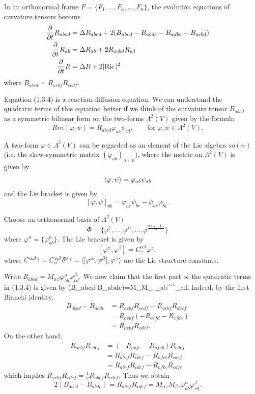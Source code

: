 In an orthonormal frame $F=\{F_1,\ldots,F_a,\ldots,F_n\}$, the
evolution equations of curvature tensors become
\begin{align}
\frac{\partial}{\partial t}R_{abcd}&=\Delta
R_{abcd}+2(B_{abcd}-B_{abdc}-B_{adbc}+B_{acbd}) \\  %
\frac{\partial}{\partial t}R_{ab}&=\Delta
R_{ab}+2R_{acbd}R_{cd}   \\%
\frac{\partial}{\partial t}R&=\Delta R+2|\Ric|^2  %
\end{align}
where $B_{abcd}=R_{aebf}R_{cedf}$.

Equation (1.3.4) is a reaction-diffusion equation. We can
understand the quadratic terms of this equation better if we think
of the curvature tensor $R_{abcd}$ as a symmetric bilinear form on
the two-forms $\Lambda^2(V)$ given by the formula
$$
Rm(\varphi,\psi)=R_{abcd}\varphi_{ab}\psi_{cd},\qquad \text{for
}\; \varphi,\psi\in\Lambda^2(V).
$$

A two-form $\varphi\in\Lambda^2(V)$ can be regarded as an element
of the Lie algebra $so(n)$ (i.e. the skew-symmetric matrix
$(\varphi _{ab})_{n\times n}$), where the metric on $\Lambda^2(V)$
is given by
$$
\langle\varphi,\psi\rangle=\varphi_{ab}\psi_{ab}
$$
and the Lie bracket is given by
$$
[\varphi,\psi]_{ab}=\varphi_{ac}\psi_{bc}-\psi_{ac}\varphi_{bc}.
$$

Choose an orthonormal basis of $\Lambda^2(V)$
$$
\Phi=\{\varphi^1,\ldots,\varphi^\alpha,\ldots,\varphi^{\frac{n(n-1)}{2}}\}
$$
where $\varphi^\alpha=\{\varphi_{ab}^\alpha\}$. The Lie bracket is
given by
$$
[\varphi^\alpha,\varphi^\beta]=C^{\alpha\beta}_\gamma\varphi^\gamma,
$$
where
$C^{\alpha\beta\gamma}=C^{\alpha\beta}_\sigma\delta^{\sigma\gamma}
=\langle[\varphi^\alpha,\varphi^\beta],\varphi^\gamma\rangle$ are the Lie
structure constants.

Write
$R_{abcd}=M_{\alpha\beta}\varphi_{ab}^\alpha\varphi^\beta_{cd}.$
We now claim that the first part of the quadratic terms in (1.3.4)
is given by (B_{abcd}-B_{abdc})=M_{\alpha\gamma}M_{\beta\gamma}
\varphi_{ab}^\alpha\varphi^\beta_{cd}.  %
\ee Indeed, by the first Bianchi identity,
\begin{align*}
B_{abcd}-B_{abdc}&  = R_{aebf}R_{cedf}-R_{aebf}R_{decf}\\
&  = R_{aebf}(-R_{cefd}-R_{cfde})\\
&  = R_{aebf}R_{cdef}.
\end{align*}
On the other hand,
\begin{align*}
R_{aebf}R_{cdef}&  = (-R_{abfe}-R_{afeb})R_{cdef}\\
&  = R_{abef}R_{cdef}-R_{afeb}R_{cdef}\\
&  = R_{abef}R_{cdef}-R_{afbe}R_{cdfe}
\end{align*}
which implies $R_{aebf}R_{cdef}=\frac{1}{2}R_{abef}R_{cdef}$. Thus
we obtain
$$
2(B_{abcd}-B_{abdc}) =R_{abef}R_{cdef}
=M_{\alpha\gamma}M_{\beta\gamma}\varphi_{ab}^\alpha\varphi^\beta_{cd}.
$$

